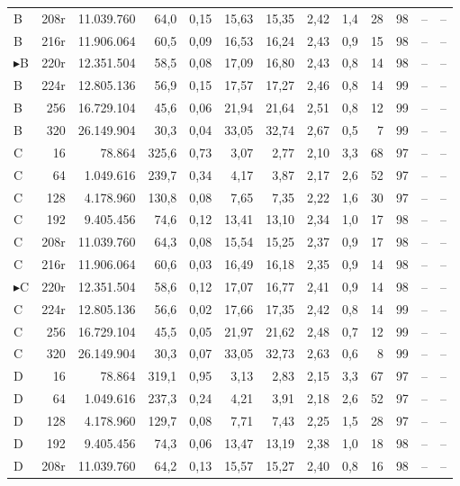 {\begin{longtable}{l r r r r r r r r r r r r}
B & 208r & 11.039.760 & 64,0 & 0,15 & 15,63 & 15,35 & 2,42 & 1,4 & 28 & 98 & -- & -- \\
B & 216r & 11.906.064 & 60,5 & 0,09 & 16,53 & 16,24 & 2,43 & 0,9 & 15 & 98 & -- & -- \\
$\blacktriangleright$B & 220r & 12.351.504 & 58,5 & 0,08 & 17,09 & 16,80 & 2,43 & 0,8 & 14 & 98 & -- & -- \\
B & 224r & 12.805.136 & 56,9 & 0,15 & 17,57 & 17,27 & 2,46 & 0,8 & 14 & 99 & -- & -- \\
B & 256 & 16.729.104 & 45,6 & 0,06 & 21,94 & 21,64 & 2,51 & 0,8 & 12 & 99 & -- & -- \\
B & 320 & 26.149.904 & 30,3 & 0,04 & 33,05 & 32,74 & 2,67 & 0,5 & 7 & 99 & -- & -- \\
\midrule
C & 16 & 78.864 & 325,6 & 0,73 & 3,07 & 2,77 & 2,10 & 3,3 & 68 & 97 & -- & -- \\
C & 64 & 1.049.616 & 239,7 & 0,34 & 4,17 & 3,87 & 2,17 & 2,6 & 52 & 97 & -- & -- \\
C & 128 & 4.178.960 & 130,8 & 0,08 & 7,65 & 7,35 & 2,22 & 1,6 & 30 & 97 & -- & -- \\
C & 192 & 9.405.456 & 74,6 & 0,12 & 13,41 & 13,10 & 2,34 & 1,0 & 17 & 98 & -- & -- \\
C & 208r & 11.039.760 & 64,3 & 0,08 & 15,54 & 15,25 & 2,37 & 0,9 & 17 & 98 & -- & -- \\
C & 216r & 11.906.064 & 60,6 & 0,03 & 16,49 & 16,18 & 2,35 & 0,9 & 14 & 98 & -- & -- \\
$\blacktriangleright$C & 220r & 12.351.504 & 58,6 & 0,12 & 17,07 & 16,77 & 2,41 & 0,9 & 14 & 98 & -- & -- \\
C & 224r & 12.805.136 & 56,6 & 0,02 & 17,66 & 17,35 & 2,42 & 0,8 & 14 & 99 & -- & -- \\
C & 256 & 16.729.104 & 45,5 & 0,05 & 21,97 & 21,62 & 2,48 & 0,7 & 12 & 99 & -- & -- \\
C & 320 & 26.149.904 & 30,3 & 0,07 & 33,05 & 32,73 & 2,63 & 0,6 & 8 & 99 & -- & -- \\
\midrule
D & 16 & 78.864 & 319,1 & 0,95 & 3,13 & 2,83 & 2,15 & 3,3 & 67 & 97 & -- & -- \\
D & 64 & 1.049.616 & 237,3 & 0,24 & 4,21 & 3,91 & 2,18 & 2,6 & 52 & 97 & -- & -- \\
D & 128 & 4.178.960 & 129,7 & 0,08 & 7,71 & 7,43 & 2,25 & 1,5 & 28 & 97 & -- & -- \\
D & 192 & 9.405.456 & 74,3 & 0,06 & 13,47 & 13,19 & 2,38 & 1,0 & 18 & 98 & -- & -- \\
D & 208r & 11.039.760 & 64,2 & 0,13 & 15,57 & 15,27 & 2,40 & 0,8 & 16 & 98 & -- & -- \\

\end{longtable}}
